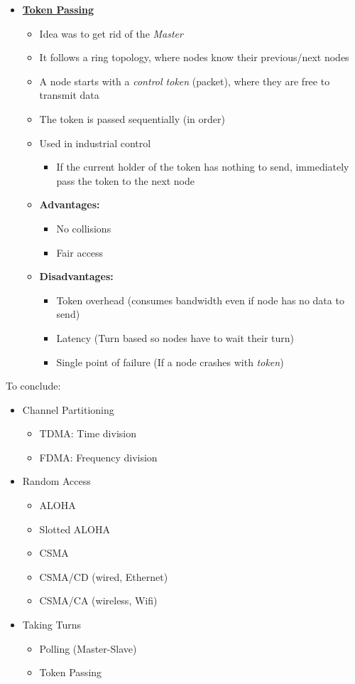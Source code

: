 \documentclass{article}
\begin{document}
\begin{itemize}
    \item \textbf{\underline{Token Passing}}
    \begin{itemize}
        \item Idea was to get rid of the \textit{Master}
        \item It follows a ring topology, where nodes know their previous/next nodes
        \item A node starts with a \textit{control token} (packet), where they are free to transmit
        data
        \item The token is passed sequentially (in order)
        \item Used in industrial control
        \begin{itemize}
            \item If the current holder of the token has nothing to send, immediately pass the token
            to the next node
        \end{itemize}
        \item \textbf{Advantages:}
        \begin{itemize}
            \item No collisions
            \item Fair access
        \end{itemize}
        \item \textbf{Disadvantages:}
        \begin{itemize}
            \item Token overhead (consumes bandwidth even if node has no data to send)
            \item Latency (Turn based so nodes have to wait their turn)
            \item Single point of failure (If a node crashes with \textit{token})
        \end{itemize}
    \end{itemize}
\end{itemize}
To conclude: 
\begin{itemize}
    \item Channel Partitioning 
    \begin{itemize}
        \item TDMA: Time division
        \item FDMA: Frequency division
    \end{itemize}
    \item Random Access 
    \begin{itemize}
        \item ALOHA
        \item Slotted ALOHA
        \item CSMA
        \item CSMA/CD (wired, Ethernet)
        \item CSMA/CA (wireless, Wifi)
    \end{itemize}
    \item Taking Turns 
    \begin{itemize}
        \item Polling (Master-Slave)
        \item Token Passing
    \end{itemize}
\end{itemize}
\end{document}

